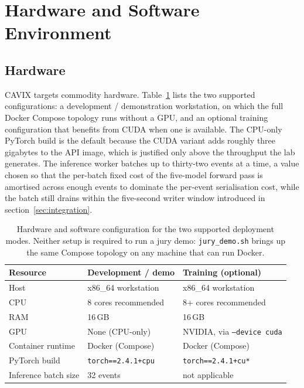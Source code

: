 \section{Hardware and Software Environment}

\subsection{Hardware}

CAVIX targets commodity hardware. Table~\ref{tab:ch4:hardware} lists
the two supported configurations: a development / demonstration
workstation, on which the full Docker \cite{docker2024} Compose
topology runs without a GPU, and an optional training configuration
that benefits from CUDA when one is available. The CPU-only PyTorch
build \cite{paszke2019pytorch} is the default because the CUDA
variant adds roughly three gigabytes to the API image, which is
justified only above the throughput the lab generates. The inference
worker batches up to thirty-two events at a time, a value chosen so
that the per-batch fixed cost of the five-model forward pass is
amortised across enough events to dominate the per-event
serialisation cost, while the batch still drains within the
five-second writer window introduced in section~\ref{sec:integration}.

\begin{table}[H]
  \centering
  \caption{Hardware and software configuration for the two supported
  deployment modes. Neither setup is required to run a jury demo:
  \texttt{jury\_demo.sh} brings up the same Compose topology on any
  machine that can run Docker.}
  \label{tab:ch4:hardware}
  \begin{tabular}{lll}
    \toprule
    \textbf{Resource}    & \textbf{Development / demo}  & \textbf{Training (optional)} \\
    \midrule
    Host                 & x86\_64 workstation          & x86\_64 workstation \\
    CPU                  & 8 cores recommended          & 8+ cores recommended \\
    RAM                  & 16\,GB                       & 16\,GB \\
    GPU                  & None (CPU-only)              & NVIDIA, via \texttt{--device cuda} \\
    Container runtime    & Docker (Compose)             & Docker (Compose) \\
    PyTorch build        & \texttt{torch==2.4.1+cpu}    & \texttt{torch==2.4.1+cu*} \\
    Inference batch size & 32 events                    & not applicable \\
    \bottomrule
  \end{tabular}
\end{table}

